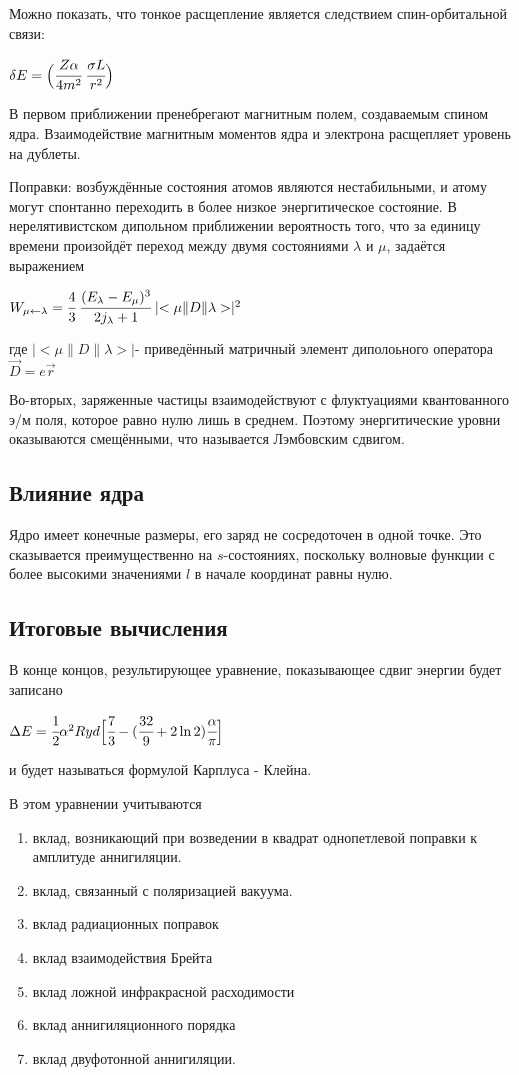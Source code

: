 \documentclass[a4paper,14pt,russian]{article}
\begin{document}
Можно показать, что тонкое расщепление является следствием спин-орбитальной связи:

$
\delta E = \Big( \cfrac {Z \alpha} {4m^2} \; \cfrac {\sigma L} {r^2} \Big)
$

В первом приближении пренебрегают магнитным полем, создаваемым спином ядра. Взаимодействие магнитным моментов ядра и электрона расщепляет уровень на дублеты.

Поправки: возбуждённые состояния атомов являются нестабильными, и атому могут спонтанно переходить в более низкое энергитическое состояние. В нерелятивистском дипольном приближении вероятность того, что за единицу времени произойдёт переход между двумя состояниями $\lambda$ и $\mu$, задаётся выражением

$
W_{\mu \leftarrow \lambda} = \cfrac {4} {3} \; \cfrac {(E_{\lambda} - E_{\mu})^3} {2j_{\lambda} + 1} \mid < \mu \| D \| \lambda >\mid^2
$

где  $\mid < \mu \| D \| \lambda >\mid $- приведённый матричный элемент диполоьного оператора $\vec{D} = e \vec{r}$

Во-вторых, заряженные частицы взаимодействуют с флуктуациями квантованного э/м поля, которое равно нулю лишь в среднем. Поэтому энергитические уровни оказываются смещёнными, что называется Лэмбовским сдвигом.


\subsection{Влияние ядра}

Ядро имеет конечные размеры, его заряд не сосредоточен в одной точке. Это сказывается преимущественно на $s$-состояниях, поскольку волновые функции с более высокими значениями $l$ в начале координат равны нулю.

\subsection{Итоговые вычисления}
В конце концов, результирующее уравнение, показывающее сдвиг энергии будет записано 

$
\Delta E = \cfrac {1} {2} \alpha^2 Ryd \Big[ \cfrac {7} {3} - (\cfrac {32} {9} + 2 \ln 2) \cfrac {\alpha} {\pi} \Big]
$

и будет называться формулой Карплуса - Клейна.

В этом уравнении учитываются
\begin{enumerate} 
\item вклад, возникающий при возведении в квадрат однопетлевой поправки к амплитуде аннигиляции.
\item вклад, связанный с поляризацией вакуума.
\item вклад радиационных поправок
\item вклад взаимодействия Брейта
\item вклад ложной инфракрасной расходимости
\item вклад аннигиляционного порядка
\item вклад двуфотонной аннигиляции.
\end{enumerate}
\newpage
\end{document}
